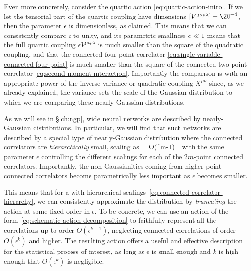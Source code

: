 {Even more concretely, consider the quartic action \eqref{eq:quartic-action-intro}. If we let the tensorial part of the quartic coupling have dimensions $[V^{\mu\nu\rho\lambda}]=\ZU^{-4}$, then the parameter $\epsilon$ is dimensionless, as claimed. This means that we can consistently compare $\epsilon$ to unity, and its parametric smallness $\epsilon\ll 1$ means that the full quartic coupling $\epsilon V^{\mu\nu\rho\lambda}$ is much smaller than the square of the quadratic coupling, and that the connected four-point correlator \eqref{eq:single-variable-connected-four-point} is much smaller than the square of the connected two-point correlator \eqref{eq:second-moment-interaction}. 
}
Importantly the comparison is with an appropriate power of the inverse variance or quadratic coupling $K^{\mu\nu}$ since, as we already explained, the variance sets the scale of the Gaussian distribution to which we are comparing these nearly-Gaussian distributions.






















As we will see in \S\ref{ch:ngp}, wide neural networks are described by nearly-Gaussian distributions. In particular, we will find that such networks are described by a special type of nearly-Gaussian distribution where the connected correlators are \emph{hierarchically} small, scaling as
\be\label{eq:connected-correlator-hierarchy}
 = O(\epsilon^{m-1})\, ,
\ee
with the same parameter $\epsilon$ controlling the different scalings for each of the $2m$-point connected correlators.
Importantly, the non-Gaussianities coming from higher-point connected correlators become parametrically less important as $\epsilon$ becomes smaller.



This means that for a  with hierarchical scalings~\eqref{eq:connected-correlator-hierarchy}, we can consistently approximate the distribution by \emph{truncating} the action at some fixed order in $\epsilon$. To be concrete, we can use an action of the form~\eqref{eq:schematic-action-decomposition} to faithfully represent all the correlations up to order $O(\epsilon^{k-1})$, neglecting connected correlations of order $O(\epsilon^k)$ and higher. The resulting action offers a useful and effective description for the statistical process of interest, as long as $\epsilon$ is small enough and $k$ is high enough that $O(\epsilon^k)$ is negligible.

